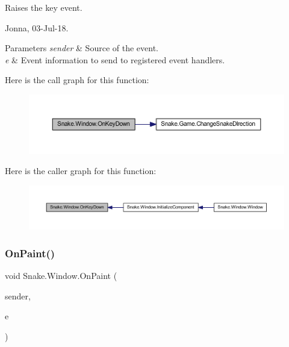Raises the key event. 

Jonna, 03-\/\+Jul-\/18. 


\begin{DoxyParams}{Parameters}
{\em sender} & Source of the event. \\
\hline
{\em e} & Event information to send to registered event handlers. \\
\hline
\end{DoxyParams}
Here is the call graph for this function\+:
\nopagebreak
\begin{figure}[H]
\begin{center}
\leavevmode
\includegraphics[width=350pt]{d8/dae/class_snake_1_1_window_af4974962d6658e8225bd9b840a3fca32_cgraph}
\end{center}
\end{figure}
Here is the caller graph for this function\+:
\nopagebreak
\begin{figure}[H]
\begin{center}
\leavevmode
\includegraphics[width=350pt]{d8/dae/class_snake_1_1_window_af4974962d6658e8225bd9b840a3fca32_icgraph}
\end{center}
\end{figure}
\mbox{\label{class_snake_1_1_window_ae50a37d5b61d3704469c2902308d96e3}} 
\subsubsection{\texorpdfstring{On\+Paint()}{OnPaint()}}
{\footnotesize\ttfamily void Snake.\+Window.\+On\+Paint (\begin{DoxyParamCaption}\item[{object}]{sender,  }\item[{Paint\+Event\+Args}]{e }\end{DoxyParamCaption})\hspace{0.3cm}{\ttfamily [private]}}



